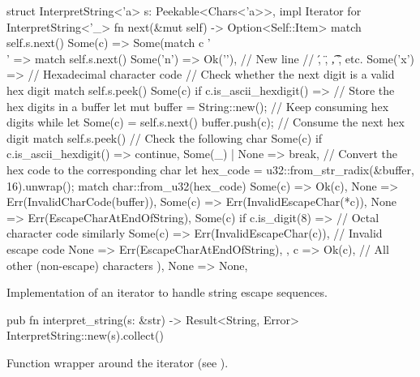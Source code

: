 \documentclass[../00-main.tex]{subfiles}
\begin{document}
\begin{listing}[t]
  \begin{RustListing}
    struct InterpretString<'a> {
        s: Peekable<Chars<'a>>,
    }
    impl Iterator for InterpretString<'_> {
        fn next(&mut self) -> Option<Self::Item> {
            match self.s.next() {
                Some(c) => Some(match c {
                    '\\' => match self.s.next() {
                        Some('n') => Ok('\n'),  // New line
                        // \', \", \t, \r, etc.
                        Some('x') => { // Hexadecimal character code
                            // Check whether the next digit is a valid hex digit
                            match self.s.peek() {
                                Some(c) if c.is_ascii_hexdigit() => {
                                    // Store the hex digits in a buffer
                                    let mut buffer = String::new();
                                    // Keep consuming hex digits
                                    while let Some(c) = self.s.next() {
                                        buffer.push(c); // Consume the next hex digit
                                        match self.s.peek() { // Check the following char
                                            Some(c) if c.is_ascii_hexdigit() => continue,
                                            Some(_) | None => break,
                                        }
                                    }
                                    // Convert the hex code to the corresponding char
                                    let hex_code = u32::from_str_radix(&buffer, 16).unwrap();
                                    match char::from_u32(hex_code) {
                                        Some(c) => Ok(c),
                                        None => Err(InvalidCharCode(buffer)),
                                    }
                                }
                                Some(c) => Err(InvalidEscapeChar(*c)),
                                None => Err(EscapeCharAtEndOfString),
                            }
                        }
                        Some(c) if c.is_digit(8) => {} // Octal character code similarly
                        Some(c) => Err(InvalidEscapeChar(c)), // Invalid escape code
                        None => Err(EscapeCharAtEndOfString),
                    },
                    c => Ok(c), // All other (non-escape) characters
                }),
                None => None,
            }
        }
    }
  \end{RustListing}
  \caption{Implementation of an iterator to handle string escape sequences.}
  \label{app:lst:string escape iterator}
\end{listing}

\begin{listing}[t]
  \begin{RustListing}
    pub fn interpret_string(s: &str) -> Result<String, Error> {
        InterpretString::new(s).collect()
    }
  \end{RustListing}
  \caption{Function wrapper around the  iterator (see ).}
  \label{app:lst:interpret string function}
\end{listing}
\end{document}
